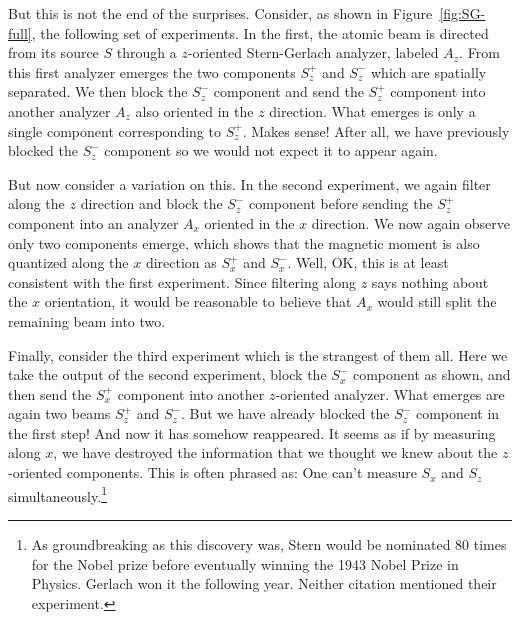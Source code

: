 But this is not the end of the surprises. Consider, as shown in Figure~\ref{fig:SG-full}, the following set of experiments. In the first, the atomic beam is directed from its source $S$ through a $z$-oriented Stern-Gerlach analyzer, labeled $A_z$. From this first analyzer emerges the two components $S_z^+$ and $S_z^-$ which are spatially separated. We then block the $S_z^-$ component and send the $S_z^+$ component into another analyzer $A_z$ also oriented in the $z$ direction. What emerges is only a single component corresponding to $S_z^+$. Makes sense! After all, we have previously blocked the $S_z^-$ component so we would not expect it to appear again. \par

But now consider a variation on this. In the second experiment, we again filter along the $z$ direction and block the $S_z^-$ component before sending the $S_z^+$ component into an analyzer $A_x$ oriented in the $x$ direction. We now again observe only two components emerge, which shows that the magnetic moment is also quantized along the $x$ direction as $S_x^+$ and $S_x^-$. Well, OK, this is at least consistent with the first experiment. Since filtering along $z$ says nothing about the $x$ orientation, it would be reasonable to believe that $A_x$ would still split the remaining beam into two. \par

Finally, consider the third experiment which is the strangest of them all. Here we take the output of the second experiment, block the $S_x^-$ component as shown, and then send the $S_x^+$ component into another $z$-oriented analyzer. What emerges are again two beams $S_z^+$ and $S_z^-$. But we have already blocked the $S_z^-$ component in the first step! And now it has somehow reappeared. It seems as if by measuring along $x$, we have destroyed the information that we thought we knew about the $z$-oriented components. This is often phrased as: One can't measure $S_x$ and $S_z$ simultaneously.\footnote{As groundbreaking as this discovery was, Stern would be nominated 80 times for the Nobel prize before eventually winning the 1943 Nobel Prize in Physics. Gerlach won it the following year. Neither citation mentioned their experiment.} \par


